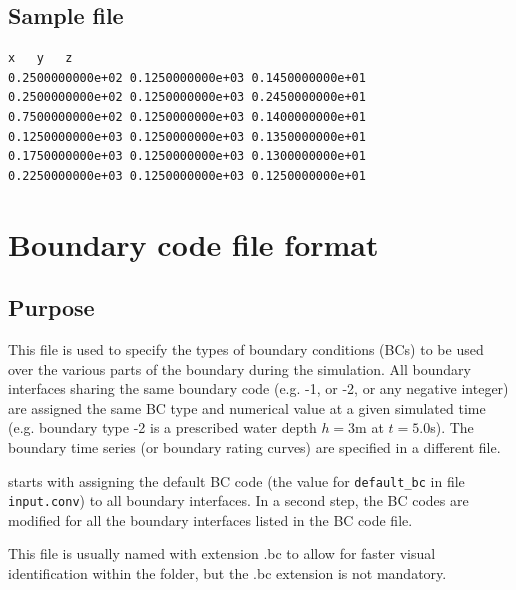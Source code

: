 \subsection{Sample file}
\begin{verbatim}
x	y	z
0.2500000000e+02 0.1250000000e+03 0.1450000000e+01
0.2500000000e+02 0.1250000000e+03 0.2450000000e+01
0.7500000000e+02 0.1250000000e+03 0.1400000000e+01
0.1250000000e+03 0.1250000000e+03 0.1350000000e+01
0.1750000000e+03 0.1250000000e+03 0.1300000000e+01
0.2250000000e+03 0.1250000000e+03 0.1250000000e+01
\end{verbatim}
\section{\label{sec:bc_file_format}Boundary code file format}
%
\subsection{Purpose}
This file is used to specify the types of boundary conditions (BCs) to be used over the various parts of the boundary during the simulation. All boundary interfaces sharing the same boundary code (e.g. -1, or -2, or any negative integer) are assigned the same BC type and numerical value at a given simulated time (e.g. boundary type -2 is a prescribed water depth $h = 3$\:m at $t=5.0$\:s). The boundary time series (or boundary rating curves) are specified in a different file.

\swConverter starts with assigning the default BC code (the value for \texttt{default\_bc} in file \texttt{input.conv}) to all boundary interfaces. In a second step, the BC codes are modified for all the boundary interfaces listed in the BC code file.

This file is usually named with extension .bc to allow for faster visual identification within the folder, but the .bc extension is not mandatory.
%
